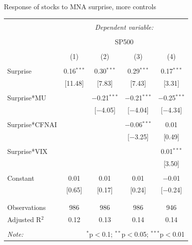\documentclass{beamer}
\begin{document}
\begin{frame}{Response of stocks to MNA surprise, more controls}
\begin{table}[!htbp] 
\centering 
\scriptsize
\begin{tabular}{@{\extracolsep{5pt}}lcccc} 
\\[-1.8ex]\hline 
\hline \\[-1.8ex] 
 & \multicolumn{4}{c}{\textit{Dependent variable:}} \\ 
\cline{2-5} 
\\[-1.8ex] & \multicolumn{4}{c}{SP500} \\ 
\\[-1.8ex] & (1) & (2) & (3) & (4)\\ 
\hline \\[-1.8ex] 
 Surprise & 0.16$^{***}$ & 0.30$^{***}$ & 0.29$^{***}$ & 0.17$^{***}$ \\ 
  & [11.48] & [7.83] & [7.43] & [3.31] \\ 
  & & & & \\ 
 Surprise*MU &  & $-$0.21$^{***}$ & $-$0.21$^{***}$ & $-$0.25$^{***}$ \\ 
  &  & [$-$4.05] & [$-$4.04] & [$-$4.34] \\ 
  & & & & \\ 
 Surprise*CFNAI &  &  & $-$0.06$^{***}$ & 0.01 \\ 
  &  &  & [$-$3.25] & [0.49] \\ 
  & & & & \\ 
 Surprise*VIX &  &  &  & 0.01$^{***}$ \\ 
  &  &  &  & [3.50] \\ 
  & & & & \\ 
 Constant & 0.01 & 0.01 & 0.01 & $-$0.01 \\ 
  & [0.65] & [0.17] & [0.24] & [$-$0.24] \\ 
  & & & & \\ 
\hline \\[-1.8ex] 
Observations & 986 & 986 & 986 & 946 \\ 
Adjusted R$^{2}$ & 0.12 & 0.13 & 0.14 & 0.14 \\ 
\hline 
\hline \\[-1.8ex] 
\textit{Note:}  & \multicolumn{4}{r}{$^{*}$p$<$0.1; $^{**}$p$<$0.05; $^{***}$p$<$0.01} \\ 
\end{tabular} 
\end{table}
\end{frame}
\end{document}
